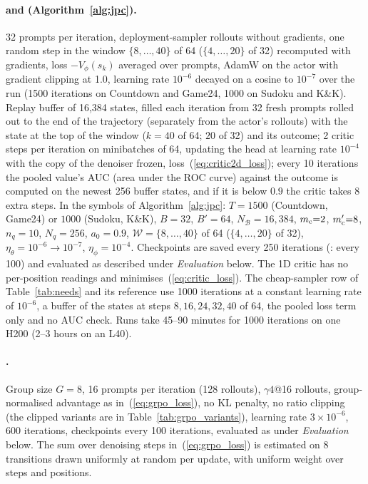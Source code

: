 \paragraph{\methodSVGScalar{} and \methodSVGTwoD{} (Algorithm~\ref{alg:jpc}).}
32 prompts per iteration, deployment-sampler rollouts without gradients, one random step in the window $\{8,\dots,40\}$ of 64 ($\{4,\dots,20\}$ of 32) recomputed with gradients, loss $-V_\phi(s_k)$ averaged over prompts, AdamW on the actor with gradient clipping at 1.0, learning rate $10^{-6}$ decayed on a cosine to $10^{-7}$ over the run (1500 iterations on Countdown and Game24, 1000 on Sudoku and K\&K). Replay buffer of 16{,}384 states, filled each iteration from 32 fresh prompts rolled out to the end of the trajectory (separately from the actor's rollouts) with the state at the top of the window ($k{=}40$ of 64; $20$ of 32) and its outcome; 2 critic steps per iteration on minibatches of 64, updating the head at learning rate $10^{-4}$ with the copy of the denoiser frozen, loss~(\ref{eq:critic2d_loss}); every 10 iterations the pooled value's AUC (area under the ROC curve) against the outcome is computed on the newest 256 buffer states, and if it is below $0.9$ the critic takes 8 extra steps. In the symbols of Algorithm~\ref{alg:jpc}: $T{=}1500$ (Countdown, Game24) or $1000$ (Sudoku, K\&K), $B{=}32$, $B'{=}64$, $N_{\mathcal B}{=}16{,}384$, $m_{\rm c}{=}2$, $m'_{\rm c}{=}8$, $n_q{=}10$, $N_q{=}256$, $a_0{=}0.9$, $\mathcal W=\{8,\dots,40\}$ of 64 ($\{4,\dots,20\}$ of 32), $\eta_\theta=10^{-6}\to10^{-7}$, $\eta_\phi=10^{-4}$. Checkpoints are saved every 250 iterations (\methodGRPO{}: every 100) and evaluated as described under \emph{Evaluation} below. The 1D critic has no per-position readings and minimises~(\ref{eq:critic_loss}). The cheap-sampler row of Table~\ref{tab:needs} and its reference use 1000 iterations at a constant learning rate of $10^{-6}$, a buffer of the states at steps $8,16,24,32,40$ of 64, the pooled loss term only and no AUC check. Runs take 45--90 minutes for 1000 iterations on one H200 (2--3 hours on an L40).

\paragraph{\methodGRPO{}.}
Group size $G{=}8$, 16 prompts per iteration (128 rollouts), $\gamma4$@16 rollouts, group-normalised advantage as in~(\ref{eq:grpo_loss}), no KL penalty, no ratio clipping (the clipped variants are in Table~\ref{tab:grpo_variants}), learning rate $3\times10^{-6}$, 600 iterations, checkpoints every 100 iterations, evaluated as under \emph{Evaluation} below. The sum over denoising steps in~(\ref{eq:grpo_loss}) is estimated on 8 transitions drawn uniformly at random per update, with uniform weight over steps and positions.


